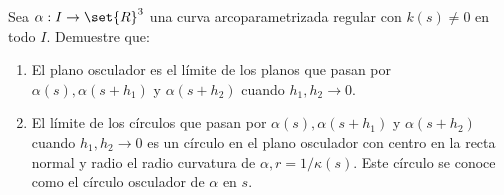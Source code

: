 \documentclass{homework}
\begin{document}
\begin{sol}
    
\end{sol}


\begin{prob}
    Sea \(\alpha:I\rightarrow\set{R}^3\) una curva arcoparametrizada regular con \(k(s)\neq0\) en todo \(I\). Demuestre que:
    \begin{enumerate}
        \item El plano osculador es el límite de los planos que pasan por \(\alpha(s),\alpha(s+h_1)\) y \(\alpha(s+h_2)\) cuando \(h_1,h_2\rightarrow0\).
        \item El límite de los círculos que pasan por \(\alpha(s),\alpha(s+h_1)\) y \(\alpha(s+h_2)\) cuando \(h_1,h_2\rightarrow0\) es un círculo en el plano osculador con centro en la recta normal y radio el radio curvatura de \(\alpha,r=1/\kappa(s)\). Este círculo se conoce como el círculo osculador de \(\alpha\) en \(s\).
    \end{enumerate}
\end{prob}

\begin{sol}
    
\end{sol}
\end{document}
